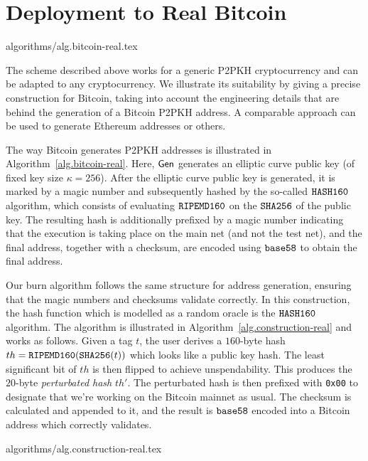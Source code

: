 \section{Deployment to Real Bitcoin}\label{sec.real}
{algorithms/alg.bitcoin-real.tex}

The scheme described above works for a generic P2PKH cryptocurrency and can be adapted to any cryptocurrency. We illustrate its suitability by giving a precise construction for Bitcoin, taking into account the engineering details that are behind the generation of a Bitcoin P2PKH address. A comparable approach can be used to generate Ethereum addresses or others.

The way Bitcoin generates P2PKH addresses is illustrated in Algorithm~\ref{alg.bitcoin-real}. Here, $\mathsf{Gen}$ generates an elliptic curve public key (of fixed key size $\kappa = 256$). After the elliptic curve public key is generated, it is marked by a magic number and subsequently hashed by the so-called $\texttt{HASH160}$ algorithm, which consists of evaluating $\texttt{RIPEMD160}$ on the $\texttt{SHA256}$ of the public key. The resulting hash is additionally prefixed by a magic number indicating that the execution is taking place on the main net (and not the test net), and the final address, together with a checksum, are encoded using $\texttt{base58}$ to obtain the final address.

Our burn algorithm follows the same structure for address generation, ensuring that the magic numbers and checksums validate correctly. In this construction, the hash function which is modelled as a random oracle is the $\texttt{HASH160}$ algorithm. The algorithm is illustrated in Algorithm~\ref{alg.construction-real} and works as follows.
Given a tag $t$, the user derives a $160$-byte
hash $th = \texttt{RIPEMD160}(\texttt{SHA256}(t))$ which looks like a public key hash.
The least significant bit of
$th$ is then flipped to achieve unspendability. This produces the $20$-byte
\emph{perturbated hash} $th'$. The perturbated hash
is then prefixed with \texttt{0x00} to designate that we're working on the Bitcoin mainnet as usual. The checksum is calculated and appended
to it, and the result is
$\texttt{base58}$ encoded into a Bitcoin address which correctly validates.

{algorithms/alg.construction-real.tex}
